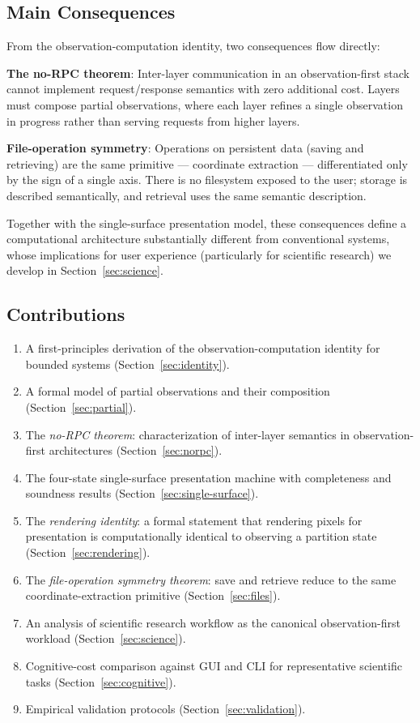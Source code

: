 \documentclass[11pt,a4paper]{article}
\theoremstyle{definition}
\theoremstyle{remark}
\begin{document}
\subsection{Main Consequences}

From the observation-computation identity, two consequences flow directly:

\textbf{The no-RPC theorem}: Inter-layer communication in an observation-first stack cannot implement request/response semantics with zero additional cost. Layers must compose partial observations, where each layer refines a single observation in progress rather than serving requests from higher layers.

\textbf{File-operation symmetry}: Operations on persistent data (saving and retrieving) are the same primitive --- coordinate extraction --- differentiated only by the sign of a single axis. There is no filesystem exposed to the user; storage is described semantically, and retrieval uses the same semantic description.

Together with the single-surface presentation model, these consequences define a computational architecture substantially different from conventional systems, whose implications for user experience (particularly for scientific research) we develop in Section~\ref{sec:science}.

\subsection{Contributions}

\begin{enumerate}
    \item A first-principles derivation of the observation-computation identity for bounded systems (Section~\ref{sec:identity}).
    \item A formal model of partial observations and their composition (Section~\ref{sec:partial}).
    \item The \emph{no-RPC theorem}: characterization of inter-layer semantics in observation-first architectures (Section~\ref{sec:norpc}).
    \item The four-state single-surface presentation machine with completeness and soundness results (Section~\ref{sec:single-surface}).
    \item The \emph{rendering identity}: a formal statement that rendering pixels for presentation is computationally identical to observing a partition state (Section~\ref{sec:rendering}).
    \item The \emph{file-operation symmetry theorem}: save and retrieve reduce to the same coordinate-extraction primitive (Section~\ref{sec:files}).
    \item An analysis of scientific research workflow as the canonical observation-first workload (Section~\ref{sec:science}).
    \item Cognitive-cost comparison against GUI and CLI for representative scientific tasks (Section~\ref{sec:cognitive}).
    \item Empirical validation protocols (Section~\ref{sec:validation}).
\end{enumerate}
\end{document}
